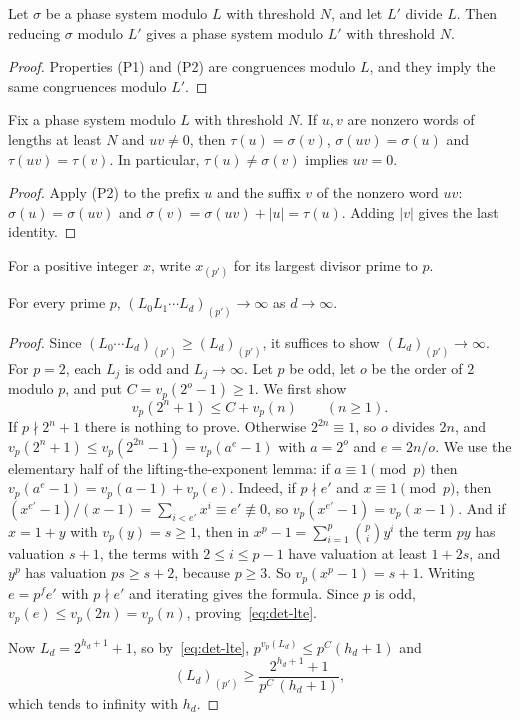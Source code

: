 \begin{lemma}\label{lem:det-divisor}
Let $\sigma$ be a phase system modulo $L$ with threshold $N$, and let $L'$ divide $L$. Then reducing $\sigma$ modulo $L'$
gives a phase system modulo $L'$ with threshold $N$.
\end{lemma}

\begin{proof}
Properties (P1) and (P2) are congruences modulo $L$, and they imply the same congruences modulo $L'$.
\end{proof}

\begin{corollary}\label{cor:det-products}
Fix a phase system modulo $L$ with threshold $N$. If $u,v$ are nonzero words of lengths at least $N$ and $uv\neq0$,
then $\tau(u)=\sigma(v)$, $\sigma(uv)=\sigma(u)$ and $\tau(uv)=\tau(v)$. In particular, $\tau(u)\neq\sigma(v)$ implies
$uv=0$.
\end{corollary}

\begin{proof}
Apply (P2) to the prefix $u$ and the suffix $v$ of the nonzero word $uv$: $\sigma(u)=\sigma(uv)$ and
$\sigma(v)=\sigma(uv)+|u|=\tau(u)$. Adding $|v|$ gives the last identity.
\end{proof}

For a positive integer $x$, write $x_{(p')}$ for its largest divisor prime to $p$.

\begin{lemma}\label{lem:det-pprime}
For every prime $p$, $(L_0L_1\cdots L_d)_{(p')}\to\infty$ as $d\to\infty$.
\end{lemma}

\begin{proof}
Since $(L_0\cdots L_d)_{(p')}\geq(L_d)_{(p')}$, it suffices to show $(L_d)_{(p')}\to\infty$. For $p=2$, each $L_j$ is odd
and $L_j\to\infty$. Let $p$ be odd, let $o$ be the order of $2$ modulo $p$, and put $C=v_p(2^o-1)\geq1$. We first show
\begin{equation}\label{eq:det-lte}
 v_p(2^n+1)\leq C+v_p(n)\qquad(n\geq1).
\end{equation}
If $p\nmid2^n+1$ there is nothing to prove. Otherwise $2^{2n}\equiv1$, so $o$ divides $2n$, and
$v_p(2^n+1)\leq v_p(2^{2n}-1)=v_p(a^e-1)$ with $a=2^o$ and $e=2n/o$. We use the elementary half of the lifting-the-exponent
lemma: if $a\equiv1\pmod p$ then $v_p(a^e-1)=v_p(a-1)+v_p(e)$. Indeed, if $p\nmid e'$ and $x\equiv1\pmod p$, then
$(x^{e'}-1)/(x-1)=\sum_{i<e'}x^i\equiv e'\not\equiv0$, so $v_p(x^{e'}-1)=v_p(x-1)$. And if $x=1+y$ with $v_p(y)=s\geq1$,
then in $x^p-1=\sum_{i=1}^p\binom pi y^i$ the term $py$ has valuation $s+1$, the terms with $2\leq i\leq p-1$ have
valuation at least $1+2s$, and $y^p$ has valuation $ps\geq s+2$, because $p\geq3$. So $v_p(x^p-1)=s+1$. Writing
$e=p^fe'$ with $p\nmid e'$ and iterating gives the formula. Since $p$ is odd, $v_p(e)\leq v_p(2n)=v_p(n)$,
proving~\eqref{eq:det-lte}.

Now $L_d=2^{h_d+1}+1$, so by~\eqref{eq:det-lte}, $p^{v_p(L_d)}\leq p^C(h_d+1)$ and
\[
 (L_d)_{(p')}\geq\frac{2^{h_d+1}+1}{p^C\,(h_d+1)},
\]
which tends to infinity with $h_d$.
\end{proof}


